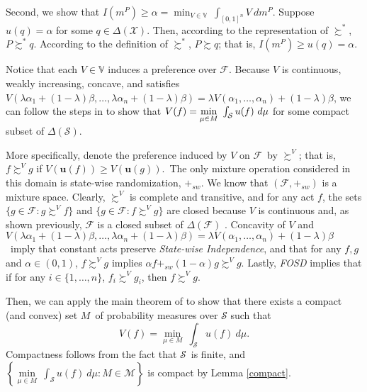 \documentclass[12pt, notitlepage]{article}
\begin{document}
Second, we show that $I(m^{P})\geq \alpha =\min_{V\in \mathbb{V}%
}~\int_{[0,1]^{n}}V~dm^{P}$. Suppose $u(q)=\alpha $ for some $q\in \Delta (%
\mathcal{X})$. Then, according to the representation of $\succsim ^{\ast }$, 
$P\succsim ^{\ast }q$. According to the definition of $\succsim ^{\ast }$, $%
P\succsim q$; that is, $I(m^{P})\geq u(q)=\alpha $.

{Notice that each $V\in \mathbb{V}$ induces a preference over $\mathcal{F}$.
Because $V$ is continuous, weakly increasing, concave,} and satisfies $%
V(\lambda \alpha _{1}+(1-\lambda )\beta ,\dots ,\lambda \alpha
_{n}+(1-\lambda )\beta )=\lambda V(\alpha _{1},\dots ,\alpha
_{n})+(1-\lambda )\beta ${, we can follow the steps in \cite%
{GilboaSchmeidler89} to show that }$V(f)=\underset{\mu \in M}{\min }~\int_{%
\mathcal{S}}u(f)~d\mu $ for some compact subset of $\Delta (\mathcal{S})${.}

More specifically, {denote the preference induced by }$V$ on $\mathcal{F}${\
by} $\succsim ^{V}$; that is, $f\succsim ^{V}g$ if $V(\mathbf{u}(f))\geq V(%
\mathbf{u}(g))$.{\ The only mixture operation considered in this domain is
state-wise randomization, $+_{sw}$. We know that $(\mathcal{F},+_{sw})$ is a
mixture space. Clearly,} $\succsim ^{V}$ {is complete and transitive, and
for any act $f$, the sets $\{g\in \mathcal{F}:g\succsim ^{V}f\}$ and $\{g\in 
\mathcal{F}:f\succsim ^{V}g\}$ are closed because }$V$ is continuous and, as
shown previously, $\mathcal{F}$ is a closed subset of $\Delta (\mathcal{F})${%
. Concavity of }$V$ and $V(\lambda \alpha _{1}+(1-\lambda )\beta ,\dots
,\lambda \alpha _{n}+(1-\lambda )\beta )=\lambda V(\alpha _{1},\dots ,\alpha
_{n})+(1-\lambda )\beta ${\ imply that constant acts preserve \textit{%
State-wise Independence}, and that for any $f,g$ and $\alpha \in (0,1)$, }$%
f\succsim ^{V}g$ {implies $\alpha f+_{sw}(1-\alpha )$}$g\succsim ^{V}g${.
Lastly, \textit{FOSD} implies that if for any }$i\in \{1,\dots ,n\}$, $%
f_{i}\succsim ^{V}g_{i}$, then $f\succsim ^{V}g$.

{Then, we can apply the main theorem of \cite{GilboaSchmeidler89} to show
that there exists a compact (and convex) set }$M${\ of probability measures
over $\mathcal{S}$ such that%
\begin{equation*}
V(f)=\underset{\mu \in M}{\min }~\int_{\mathcal{S}}u(f)~d\mu .
\end{equation*}%
Compactness follows from the fact that }$\mathcal{S}$\ is finite, and{\ $%
\left\{ \underset{\mu \in M}{\min }~\int_{\mathcal{S}}u(f)~d\mu :M\in 
\mathcal{M}\right\} $ is compact by Lemma \ref{compact}.}
\end{document}
